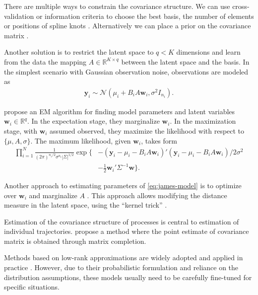 \documentclass[preprint]{imsart}
\numberwithin{equation}{section}
\theoremstyle{plain}
\newcommand{\cN}{\mathcal{N}}
\newcommand{\R}{\mathbb{R}}
\newcommand{\by}{\mathbf{y}}
\newcommand{\bb}{\mathbf{b}}
\newcommand{\bw}{\mathbf{w}}
\begin{document}
There are multiple ways to constrain the covariance structure. We can use cross-validation or information criteria to choose the best basis, the number of elements or positions of spline knots \citep{rice2001nonparametric,bigelow2009bayesian}. Alternatively we can place a prior on the covariance matrix \citep{maclehose2009nonparametric}.

Another solution is to restrict the latent space to $q < K$ dimensions and learn from the data the mapping $A \in \R^{K \times q}$ between the latent space and the basis. In the simplest scenario with Gaussian observation noise, observations are modeled as
\begin{align}\label{eq:james-model}
 \mathbf{y}_i \sim \cN(\mu_i + B_i A \mathbf{w}_i, \sigma^2I_{n_i}).
\end{align}

\citet{james2000principal} propose an EM algorithm for finding model parameters and latent variables $\bw_i \in \R^q$. In the expectation stage, they marginalize $\bw_i$. %
In the maximization stage, with $\bw_i$ assumed observed, they maximize the likelihood with respect to $\{\mu,A,\sigma\}$. The maximum likelihood, given $\bw_i$, takes form
\begin{align}
\prod_{i=1}^N \frac{1}{(2\pi)^{n_i/2} \sigma^{n_i} |\Sigma|^{1/2}} \exp\{ &-(\by_i - \mu_i - B_i A \bw_i)'(\by_i - \mu_i - B_i A \bw_i) / 2\sigma^2 \nonumber\\
&- \frac{1}{2}\bw_i' \Sigma^{-1} \bw \}.\label{eq:likelihood}
\end{align}

Another approach to estimating parameters of \eqref{eq:james-model} is to optimize over $\bw_i$ and marginalize $A$ \citep{lawrence2004gaussian}. This approach allows modifying the distance measure in the latent space, using the ``kernel trick'' \citep{schulam2016disease}.

Estimation of the covariance structure of processes is central to estimation of individual trajectories. \citet{descary2016functional} propose a method where the point estimate of covariance matrix is obtained through matrix completion. 

Methods based on low-rank approximations are widely adopted and applied in practice \citep{berkey1983longitudinal, yan2017dynamic, hall2006properties, besse1986principal, yao2006penalized, greven2011longitudinal}. However, due to their probabilistic formulation and reliance on the distribution assumptions, these models usually need to be carefully fine-tuned for specific situations.
\end{document}

